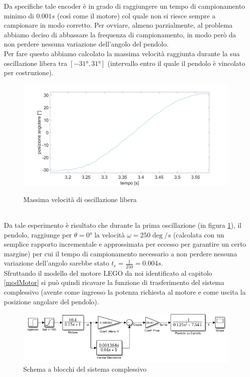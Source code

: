 Da specifiche tale encoder è in grado di raggiungere un tempo di campionamento minimo di $0.001s$ (così come il motore) col quale non si riesce sempre a campionare in modo corretto. Per ovviare, almeno parzialmente, al problema abbiamo deciso di abbassare la frequenza di campionamento, in modo però da non perdere nessuna variazione dell'angolo del pendolo.\\
Per fare questo abbiamo calcolato la massima velocità raggiunta durante la sua oscillazione libera tra $[\ang{-31},\ang{+31}]$ (intervallo entro il quale il pendolo è vincolato per costruzione).
\begin{figure}[ht]
	\centering
	\includegraphics[width=\textwidth]{SlewRate.PNG}\\
	\caption{Massima velocità di oscillazione libera}
	\label{slewRate}
\end{figure}
\\Da tale esperimento è risultato che durante la prima oscillazione (in figura \ref{slewRate}), il pendolo, raggiunge per $\theta=\ang{0}$ la velocità $\omega=250\deg/s$ (calcolata con un semplice rapporto incrementale e approssimata per eccesso per garantire un certo margine) per cui il tempo di campionamento necessario a non perdere nessuna variazione dell'angolo sarebbe stato $t_c=\displaystyle\frac{1}{250}=0.004s$.\\

Sfruttando il modello del motore LEGO da noi identificato al capitolo \ref{modMotor} si può quindi ricavare la funzione di trasferimento del sistema complessivo (avente come ingresso la potenza richiesta al motore e come uscita la posizione angolare del pendolo).\begin{figure}[ht]
	\centering
	\includegraphics[width=\textwidth]{SisComplessivoPendoloNormale.PNG}
	\caption{Schema a blocchi del sistema complessivo}
	\label{SisComplessivoPendoloNormale}
\end{figure}

